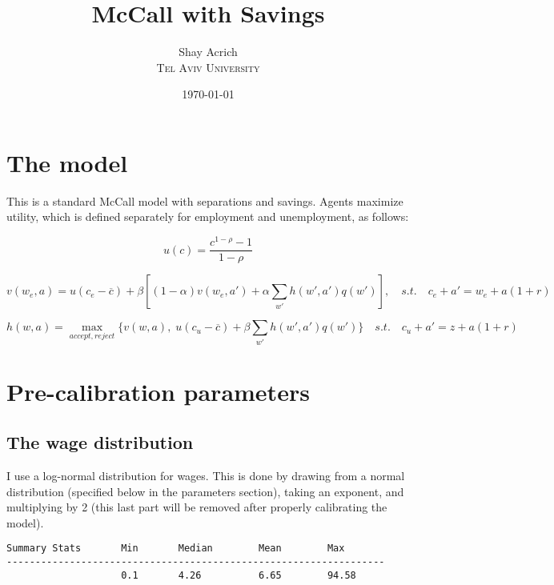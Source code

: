 \documentclass[12pt]{article}
\title{McCall with Savings} %
\author{Shay Acrich\\ %
\textsc{Tel Aviv University}
}
\date{\today} %
\begin{document}
\maketitle


\tableofcontents

\newpage

\section{The model}

This is a standard McCall model with separations and savings. Agents maximize utility, which is defined separately for employment and unemployment, as follows:

\begin{equation}
    u(c) = \frac{c^{1 - \rho} - 1}{1 - \rho}
\end{equation}

\begin{equation}
    v(w_e, a) = u(c_e - \overline{c}) + \beta [(1 - \alpha) v(w_e, a') + \alpha \sum_{w'} h(w', a') q(w')], \quad s.t. \quad c_e + a' = w_e + a (1 + r)
\end{equation}

\begin{equation}
    h(w,a) = \max_{accept,reject} \{ v(w,a), \; u(c_u - \overline{c}) + \beta \sum_{w'} h(w', a') q(w') \} \quad s.t. \quad c_u + a' = z + a (1 + r)
\end{equation}

\newpage

\section{Pre-calibration parameters}

\subsection{The wage distribution}

I use a log-normal distribution for wages. This is done by drawing from a normal distribution (specified below in the parameters section), taking an exponent, and multiplying by 2 (this last part will be removed after properly calibrating the model).

\begin{Verbatim}[frame = single, fontsize = \footnotesize]
Summary Stats       Min       Median        Mean        Max
------------------------------------------------------------------
                    0.1       4.26          6.65        94.58
\end{Verbatim}
\end{document}
